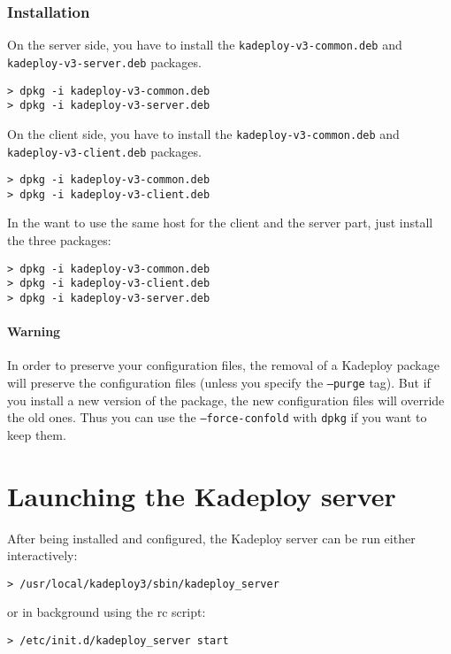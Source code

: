 \documentclass[a4wide,10pt,oneside]{book}
\begin{document}
\subsubsection{Installation}
\noindent On the server side, you have to install the \texttt{kadeploy-v3-common.deb} and \texttt{kadeploy-v3-server.deb} packages.
\begin{small}
\begin{verbatim}
> dpkg -i kadeploy-v3-common.deb
> dpkg -i kadeploy-v3-server.deb
\end{verbatim}
\end{small}

\noindent On the client side, you have to install the \texttt{kadeploy-v3-common.deb} and \texttt{kadeploy-v3-client.deb} packages.
\begin{small}
\begin{verbatim}
> dpkg -i kadeploy-v3-common.deb
> dpkg -i kadeploy-v3-client.deb
\end{verbatim}
\end{small}

\noindent In the want to use the same host for the client and the server part, just install the three packages:
\begin{small}
\begin{verbatim}
> dpkg -i kadeploy-v3-common.deb
> dpkg -i kadeploy-v3-client.deb
> dpkg -i kadeploy-v3-server.deb
\end{verbatim}
\end{small}

\paragraph{Warning}
In order to preserve your configuration files, the removal of a Kadeploy package will preserve the configuration files (unless you specify the \texttt{--purge} tag). But if you install a new version of the package, the new configuration files will override the old ones. Thus you can use the \texttt{--force-confold} with \texttt{dpkg} if you want to keep them.

\section{Launching the Kadeploy server}
After being installed and configured, the Kadeploy server can be run either interactively:
\begin{small}
\begin{verbatim}
> /usr/local/kadeploy3/sbin/kadeploy_server
\end{verbatim}
\end{small}
\noindent or in background using the rc script:
\begin{small}
\begin{verbatim}
> /etc/init.d/kadeploy_server start
\end{verbatim}
\end{small}
\end{document}
